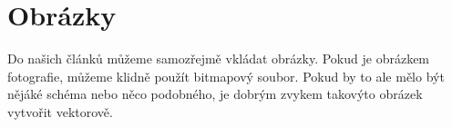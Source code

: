 \documentclass[11pt,a4paper]{article}
\begin{document}
\section{Obrázky}
Do našich článků můžeme samozřejmě vkládat obrázky. Pokud je obrázkem fotografie, můžeme klidně použít bitmapový soubor. Pokud by to ale mělo být nějáké schéma nebo něco podobného, je dobrým zvykem takovýto obrázek vytvořit vektorově.
\begin{figure}[h]
  \begin{center}
\end{center}
\end{figure}
\end{document}
